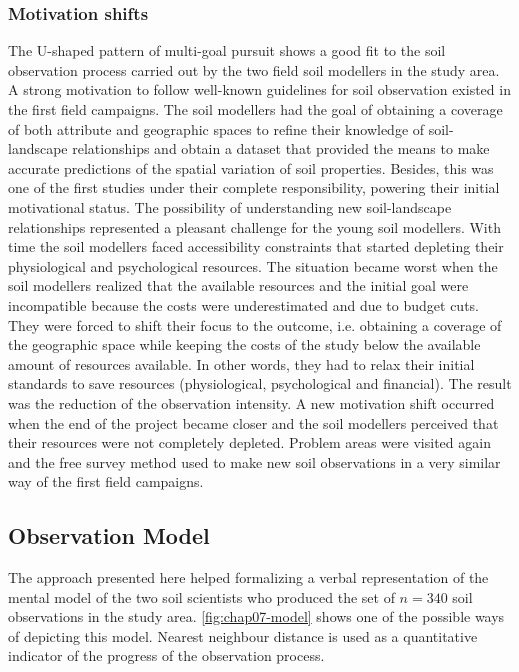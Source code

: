 \subsubsection{Motivation shifts}

The U-shaped pattern of multi-goal pursuit shows a good fit to the soil observation process carried out by the 
two field soil modellers in the study area. A strong motivation to follow well-known guidelines for soil 
observation existed in the first field campaigns. The soil modellers had the goal of obtaining a coverage of 
both attribute and geographic spaces to refine their knowledge of soil-landscape relationships and obtain a 
dataset that provided the means to make accurate predictions of the spatial variation of soil properties. 
Besides, this was one of the first studies under their complete responsibility, powering their initial 
motivational status. The possibility of understanding new soil-landscape relationships represented
a pleasant challenge for the young soil modellers. With time the soil modellers faced accessibility 
constraints that started depleting their physiological and psychological resources. The situation became worst 
when the soil modellers realized that the available resources and the initial goal were incompatible because 
the costs were underestimated and due to budget cuts. They were forced to shift their focus to the outcome, 
i.e. obtaining a  coverage of the geographic space while keeping the costs of the study 
below the available amount of resources available. In other words, they had to relax their initial standards 
to save resources (physiological, psychological and financial). The result was the reduction of the 
observation intensity. A new motivation shift occurred when the end of the project became closer and the soil 
modellers perceived that their resources were not completely depleted. Problem areas were visited again and 
the free survey method used to make new soil observations in a very similar way of the first field campaigns.

\subsection{Observation Model}

The approach presented here helped formalizing a verbal representation of the mental model of the two soil 
scientists who produced the set of $n = 340$ soil observations in the study area. \autoref{fig:chap07-model} 
shows one of the possible ways of depicting this model. Nearest neighbour distance is 
used as a quantitative indicator of the progress of the observation process.

